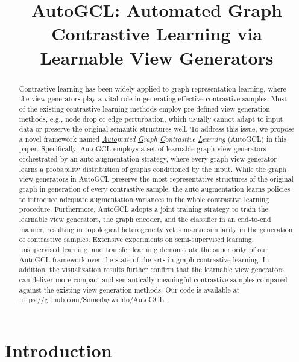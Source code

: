 \title{AutoGCL: Automated Graph Contrastive Learning via \\ Learnable View Generators}



\maketitle

\begin{abstract}
Contrastive learning has been widely applied to graph representation learning, where the view generators play a vital role in generating effective contrastive samples. Most of the existing contrastive learning methods employ pre-defined view generation methods, e.g., node drop or edge perturbation, which usually cannot adapt to input data or preserve the original semantic structures well. To address this issue, we propose a novel framework named \emph{\underline{Auto}mated \underline{G}raph \underline{C}ontrastive \underline{L}earning} (AutoGCL) in this paper. Specifically, AutoGCL employs a set of learnable graph view generators orchestrated by an auto augmentation strategy, where every graph view generator learns a probability distribution of graphs conditioned by the input. While the graph view generators in AutoGCL preserve the most representative structures of the original graph in generation of every contrastive sample, the auto augmentation learns policies to introduce adequate augmentation variances in the whole contrastive learning procedure. Furthermore, AutoGCL adopts a joint training strategy to train the learnable view generators, the graph encoder, and the classifier in an end-to-end manner, resulting in topological heterogeneity yet semantic similarity in the generation of contrastive samples. Extensive experiments on semi-supervised learning, unsupervised learning, and transfer learning demonstrate the superiority of our AutoGCL framework over the state-of-the-arts in graph contrastive learning. In addition, the visualization results further confirm that the learnable view generators can deliver more compact and semantically meaningful contrastive samples compared against the existing view generation methods. Our code is available at \url{https://github.com/Somedaywilldo/AutoGCL}.
\end{abstract}

\section{Introduction}

